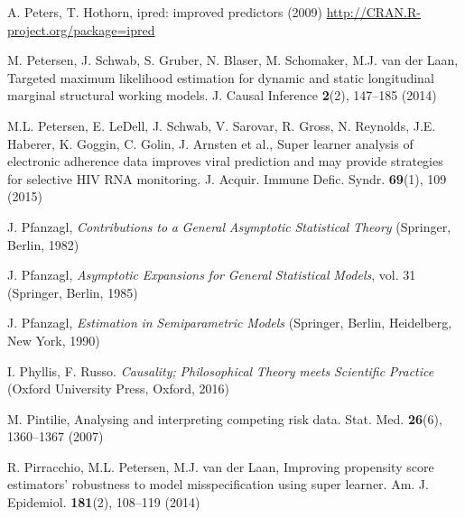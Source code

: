\begin{list}{}{\setlength{\leftmargin}{2.1em}\setlength{\labelwidth}{0pt}
  \setlength{\labelsep}{0pt}\setlength{\itemindent}{-2.1em}
  \setlength{\parsep}{0pt}\setlength{\itemsep}{2pt}\setlength{\topsep}{0pt}}
\item\label{refentry:REF270}A. Peters, T. Hothorn, ipred: improved predictors (2009) \url{http://CRAN.R-project.org/package=ipred}\label{refend:REF270}
\item\label{refentry:REF271}M. Petersen, J. Schwab, S. Gruber, N. Blaser, M. Schomaker, M.J. van der Laan, Targeted maximum likelihood estimation for dynamic and static longitudinal marginal structural working models. J. Causal Inference \textbf{2}(2), 147--185 (2014)\label{refend:REF271}
\item\label{refentry:REF272}M.L. Petersen, E. LeDell, J. Schwab, V. Sarovar, R. Gross, N. Reynolds, J.E. Haberer, K. Goggin, C. Golin, J. Arnsten et al., Super learner analysis of electronic adherence data improves viral prediction and may provide strategies for selective HIV RNA monitoring. J. Acquir. Immune Defic. Syndr. \textbf{69}(1), 109 (2015)\label{refend:REF272}
\item\label{refentry:REF273}J. Pfanzagl, \textit{Contributions} \textit{to} \textit{a} \textit{General} \textit{Asymptotic} \textit{Statistical} \textit{Theory} (Springer, Berlin, 1982)\label{refend:REF273}
\item\label{refentry:REF274}J. Pfanzagl, \textit{Asymptotic} \textit{Expansions} \textit{for} \textit{General} \textit{Statistical} \textit{Models}, vol. 31 (Springer, Berlin, 1985)\label{refend:REF274}
\item\label{refentry:REF275}J. Pfanzagl, \textit{Estimation} \textit{in} \textit{Semiparametric} \textit{Models} (Springer, Berlin, Heidelberg, New York, 1990)\label{refend:REF275}
\item\label{refentry:REF276}I. Phyllis, F. Russo. \textit{Causality;} \textit{Philosophical} \textit{Theory} \textit{meets} \textit{Scientific} \textit{Practice} (Oxford University Press, Oxford, 2016)\label{refend:REF276}
\item\label{refentry:REF277}M. Pintilie, Analysing and interpreting competing risk data. Stat. Med. \textbf{26}(6), 1360--1367 (2007)\label{refend:REF277}
\item\label{refentry:REF278}R. Pirracchio, M.L. Petersen, M.J. van der Laan, Improving propensity score estimators' robustness to model misspecification using super learner. Am. J. Epidemiol. \textbf{181}(2), 108--119 (2014)\label{refend:REF278}

\end{list}
